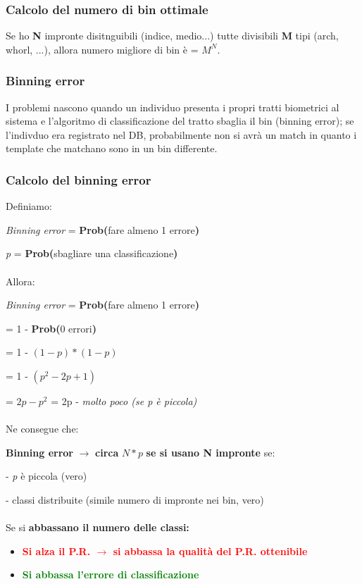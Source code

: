 \documentclass{report}
\begin{document}
\subsubsection{Calcolo del numero di bin ottimale}

Se ho \textbf{N} impronte disitnguibili (indice, medio...) tutte divisibili \textbf{M} tipi (arch, whorl, ...), allora 
numero migliore di bin è = \textbf{$M^N$}.

\subsubsection{Binning error}

I  problemi nascono quando un individuo presenta i propri
tratti biometrici al sistema e l’algoritmo di classificazione
del tratto sbaglia il bin (binning error); se l'indivduo era registrato nel DB, probabilmente non si avrà un match in quanto i template che matchano sono in un bin differente.

\newpage

\subsubsection{Calcolo del binning error}

Definiamo:

\textit{Binning error} = \textbf{Prob(}fare almeno 1 errore\textbf{)}

\textit{p} = \textbf{Prob(}sbagliare una classificazione\textbf{)} \\\\
Allora:

\textit{Binning error} = \textbf{Prob(}fare almeno 1 errore\textbf{)}

= 1 - \textbf{Prob(}0 errori\textbf{)}

= 1 - $(1-p)*(1-p)$

= 1 - $(p^2-2p+1)$

= $2p - p^2$ = 2p - \textit{molto poco (se p è piccola)}
\\
\\
Ne consegue che:

\textbf{Binning error} $\rightarrow$ \textbf{circa} $N*p$ \textbf{se si usano N impronte} se:

- \textit{p} è piccola (vero)

- classi distribuite (simile numero di impronte nei bin, vero)\\\\
Se si \textbf{abbassano il numero delle classi:}
\begin{itemize}
    \item \textbf{\textcolor{red}{Si alza il P.R. $\rightarrow$ si abbassa la qualità del P.R. ottenibile}}
    \item \textbf{\textcolor{green}{Si abbassa l'errore di classificazione}}
\end{itemize}
\end{document}
